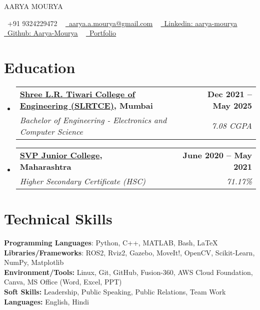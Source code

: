 \documentclass[letterpaper,11pt]{article}
\makeatletter
\newcommand{\resumeSubheading}[4]{
  \vspace{-2pt}\item
    \begin{tabular*}{1.0\textwidth}[t]{l@{\extracolsep{\fill}}r}
      \textbf{#1} & \textbf{\small #2} \\
      \textit{\small#3} & \textit{\small #4} \\
    \end{tabular*}\vspace{-7pt}
}
\newcommand{\resumeSubHeadingListStart}{\begin{itemize}[leftmargin=0.0in, label={}]}
\newcommand{\resumeSubHeadingListEnd}{\end{itemize}}
\makeatother
\begin{document}
\begin{center}
    {\Huge \scshape AARYA MOURYA} \\ \vspace{5pt}
    
    \small 
    \raisebox{-0.1\height}\faPhone\ +91 9324229472 ~ 
    \href{mailto:aarya.a.mourya@gmail.com}{\raisebox{-0.2\height}\faEnvelope\  \underline{aarya.a.mourya@gmail.com}} ~ 
    \href{https://www.linkedin.com/in/aarya-mourya-444051566612094454/}{\raisebox{-0.2\height}\faLinkedin\ \underline{Linkedin: aarya-mourya}} ~
    \href{https://github.com/Aarya-Mourya}{\raisebox{-0.2\height}\faGithub\ \underline{Github: Aarya-Mourya}} ~
    \href{https://aarya-mourya.github.io/aarya-mourya-portfolio.io/}{\raisebox{-0.2\height}\faGlobe\ \underline{Portfolio}}
    \vspace{-8pt}
\end{center}


\section{Education}
  \resumeSubHeadingListStart
    \resumeSubheading
      {\href{https://slrtce.in/}{Shree L.R. Tiwari College of Engineering (SLRTCE)}, Mumbai}{Dec 2021 -- May 2025}
      {Bachelor of Engineering - Electronics and Computer Science}{7.08 CGPA}
    
    \resumeSubheading
      {\href{https://svpjc.in/}{SVP Junior College}, Maharashtra}{June 2020 -- May 2021}
      {Higher Secondary Certificate (HSC)}{71.17\%}
  \resumeSubHeadingListEnd

\section{Technical Skills}
 \begin{itemize}[leftmargin=0.15in, label={}]
    \small{\item{
     \textbf{Programming Languages}{: Python, C++, MATLAB, Bash, \LaTeX} \\
     \textbf{Libraries/Frameworks}{: ROS2, Rviz2, Gazebo, MoveIt!, OpenCV, Scikit-Learn, NumPy, Matplotlib} \\
     \textbf{Environment/Tools:}{ Linux, Git, GitHub, Fusion-360, AWS Cloud Foundation, Canva, MS Office (Word, Excel, PPT)} \\
     \textbf{Soft Skills:}{ Leadership, Public Speaking, Public Relations, Team Work} \\
     \textbf{Languages:}{ English, Hindi} \\
    }}
 \end{itemize}
 \vspace{-16pt}
\end{document}
